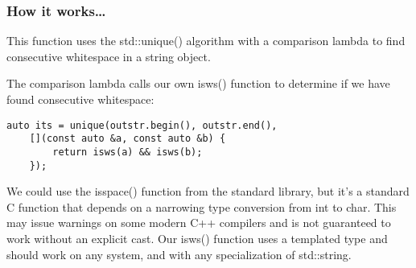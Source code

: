 \subsubsection{How it works…}

This function uses the std::unique() algorithm with a comparison lambda to find consecutive whitespace in a string object.

The comparison lambda calls our own isws() function to determine if we have found consecutive whitespace:

\begin{lstlisting}[style=styleCXX]
auto its = unique(outstr.begin(), outstr.end(),
	[](const auto &a, const auto &b) {
		return isws(a) && isws(b);
	});
\end{lstlisting}

We could use the isspace() function from the standard library, but it's a standard C function that depends on a narrowing type conversion from int to char. This may issue warnings on some modern C++ compilers and is not guaranteed to work without an explicit cast. Our isws() function uses a templated type and should work on any system, and with any specialization of std::string.